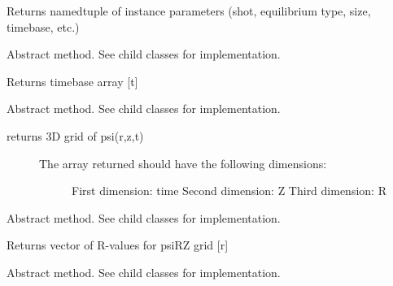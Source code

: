 \documentclass[letterpaper,10pt,english]{sphinxmanual}
\begin{document}
\begin{fulllineitems}
\begin{fulllineitems}
Returns namedtuple of instance parameters (shot, equilibrium type, size, timebase, etc.)

\end{fulllineitems}


\begin{fulllineitems}
\label{eqtools:eqtools.core.Equilibrium.getTimeBase}
Abstract method.  See child classes for implementation.

Returns timebase array {[}t{]}

\end{fulllineitems}


\begin{fulllineitems}
\label{eqtools:eqtools.core.Equilibrium.getFluxGrid}
Abstract method.  See child classes for implementation.
\begin{description}
\item[{returns 3D grid of psi(r,z,t)}] \leavevmode\begin{description}
\item[{The array returned should have the following dimensions:}] \leavevmode
First dimension: time
Second dimension: Z
Third dimension: R

\end{description}

\end{description}

\end{fulllineitems}


\begin{fulllineitems}
\label{eqtools:eqtools.core.Equilibrium.getRGrid}
Abstract method.  See child classes for implementation.

Returns vector of R-values for psiRZ grid {[}r{]}

\end{fulllineitems}


\begin{fulllineitems}
\label{eqtools:eqtools.core.Equilibrium.getZGrid}
Abstract method.  See child classes for implementation.


\end{fulllineitems}
\end{fulllineitems}
\end{document}
